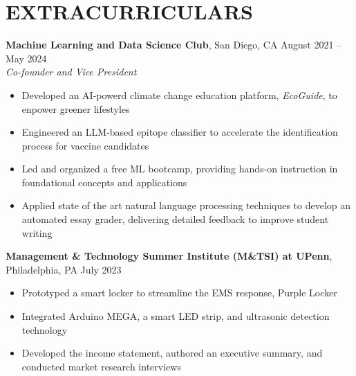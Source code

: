 \section*{EXTRACURRICULARS}
\noindent
\textbf{Machine Learning and Data Science Club}, San Diego, CA \hfill August 2021 -- May 2024 \\
\textit{Co-founder and Vice President}
\begin{itemize}
	\item Developed an AI-powerd climate change education platform, \textit{EcoGuide}, to enpower greener lifestyles
	\item Engineered an LLM-based epitope classifier to accelerate the identification process for vaccine candidates
	\item Led and organized a free ML bootcamp, providing hands-on instruction in foundational concepts and  applications
	\item Applied state of the art natural language processing techniques to develop an automated essay grader, delivering detailed feedback to improve student writing \\
\end{itemize}

\noindent
\textbf{Management \& Technology Summer Institute (M\&TSI) at UPenn}, Philadelphia, PA \hfill July 2023
\begin{itemize}
	\item Prototyped a smart locker to streamline the EMS response, Purple Locker
	\item Integrated Arduino MEGA, a smart LED strip, and ultrasonic detection technology
	\item Developed the income statement, authored an executive summary, and conducted market research interviews
\end{itemize}

